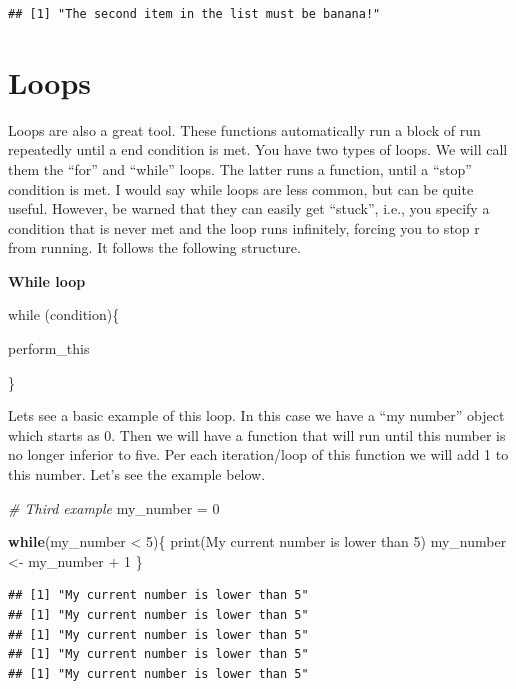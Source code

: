 \documentclass[
]{book}
\newenvironment{Shaded}{\begin{snugshade}}{\end{snugshade}}
\newcommand{\CommentTok}[1]{\textcolor[rgb]{0.56,0.35,0.01}{\textit{#1}}}
\newcommand{\ControlFlowTok}[1]{\textcolor[rgb]{0.13,0.29,0.53}{\textbf{#1}}}
\newcommand{\DecValTok}[1]{\textcolor[rgb]{0.00,0.00,0.81}{#1}}
\newcommand{\FunctionTok}[1]{\textcolor[rgb]{0.00,0.00,0.00}{#1}}
\newcommand{\NormalTok}[1]{#1}
\newcommand{\OtherTok}[1]{\textcolor[rgb]{0.56,0.35,0.01}{#1}}
\newcommand{\SpecialCharTok}[1]{\textcolor[rgb]{0.00,0.00,0.00}{#1}}
\newcommand{\StringTok}[1]{\textcolor[rgb]{0.31,0.60,0.02}{#1}}
\begin{document}
\begin{verbatim}
## [1] "The second item in the list must be banana!"
\end{verbatim}

\hypertarget{loops}{%
\section{Loops}\label{loops}}

Loops are also a great tool. These functions automatically run a block of run repeatedly until a
end condition is met.
You have two types of loops. We will call them the ``for'' and ``while'' loops. The latter runs a function, until a ``stop'' condition is met. I would say while loops are less common, but can be quite useful. However, be warned that they can easily get ``stuck'', i.e., you specify a condition that is never met and the loop runs infinitely, forcing you to stop r from running. It follows the following structure.

\textbf{While loop}

while (condition)\{

perform\_this

\}

Lets see a basic example of this loop. In this case we have a ``my number'' object which starts as 0. Then we will have a function that will run until this number is no longer inferior to five. Per each iteration/loop of this function we will add 1 to this number. Let's see the example below.

\begin{Shaded}
\begin{Highlighting}[]
\CommentTok{\# Third example}
\NormalTok{my\_number }\OtherTok{=} \DecValTok{0}

\ControlFlowTok{while}\NormalTok{(my\_number }\SpecialCharTok{\textless{}} \DecValTok{5}\NormalTok{)\{}
  \FunctionTok{print}\NormalTok{(}\StringTok{\textquotesingle{}My current number is lower than 5\textquotesingle{}}\NormalTok{)}
\NormalTok{  my\_number }\OtherTok{\textless{}{-}}\NormalTok{ my\_number }\SpecialCharTok{+} \DecValTok{1}
\NormalTok{\}}
\end{Highlighting}
\end{Shaded}

\begin{verbatim}
## [1] "My current number is lower than 5"
## [1] "My current number is lower than 5"
## [1] "My current number is lower than 5"
## [1] "My current number is lower than 5"
## [1] "My current number is lower than 5"
\end{verbatim}
\end{document}
